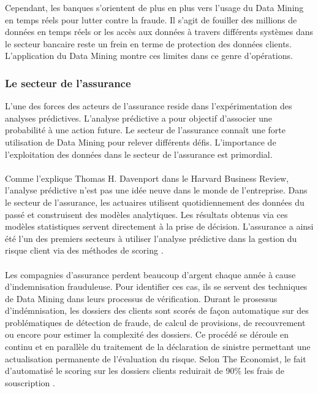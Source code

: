 \documentclass[11pt,a4paper]{report}
\begin{document}
Cependant, les banques s'orientent de plus en plus vers l'usage du Data Mining en temps réels pour lutter contre la fraude. Il s'agit de fouiller des millions de données en temps réels or les accès aux données à travers différents systèmes dans le secteur bancaire reste un frein en terme de protection des données clients. L'application du Data Mining montre ces limites dans ce genre d'opérations. 

  \subsubsection{Le secteur de l'assurance}
  L'une des forces des acteurs de l'assurance 
 reside dans l'expérimentation des analyses prédictives. L'analyse prédictive a pour objectif d'associer une probabilité à une action future. 
  Le secteur de l'assurance connaît  une forte utilisation de Data Mining pour relever différents défis. L'importance de l'exploitation des données dans le secteur de l'assurance est primordial. \\\\
  Comme l’explique Thomas H. Davenport \cite{thomas} dans le Harvard Business Review, l’analyse prédictive n’est pas une idée neuve dans le monde de l’entreprise. Dans le secteur de l’assurance, les actuaires utilisent quotidiennement des données du passé et construisent des modèles analytiques. Les résultats obtenus via ces modèles statistiques servent directement à la prise de décision. L’assurance a ainsi été l'un des premiers secteurs à utiliser l’analyse prédictive dans la gestion du risque client via des méthodes de scoring \cite{Benjamin}.\\\\
  Les compagnies d'assurance perdent beaucoup d'argent chaque année à cause d'indemnisation frauduleuse. Pour identifier ces cas, ils se servent des techniques de Data Mining dans leurs processus de vérification. Durant le prosessus d'indémnisation, les dossiers des clients sont scorés de façon automatique sur des problématiques de détection de fraude, de calcul de provisions, de recouvrement ou encore pour estimer la complexité des dossiers. Ce procédé se déroule en continu et en parallèle du traitement de la déclaration de sinistre permettant une actualisation permanente de l’évaluation du risque. Selon The Economist, le fait d'automatisé le scoring sur les dossiers clients reduirait de 90\% les frais de souscription \cite{assurance_fraude}.\\\\
 
\end{document}
